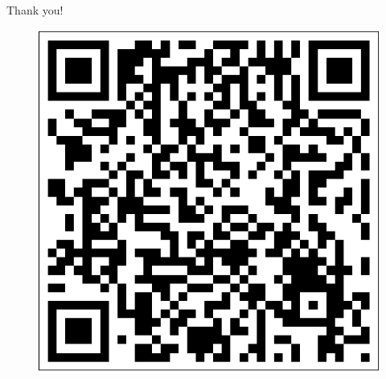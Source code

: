 \documentclass[xcolor=table,dvipsnames,svgnames]{beamer}
\begin{document}
\begin{frame}
  \begin{center}
    {\Huge\calligra Thank you!}
  \end{center}
  \begin{figure}[htbp]
    \centering
    \includegraphics[height=.2\textheight]{url.pdf}
  \end{figure}
\end{frame}
\end{document}
